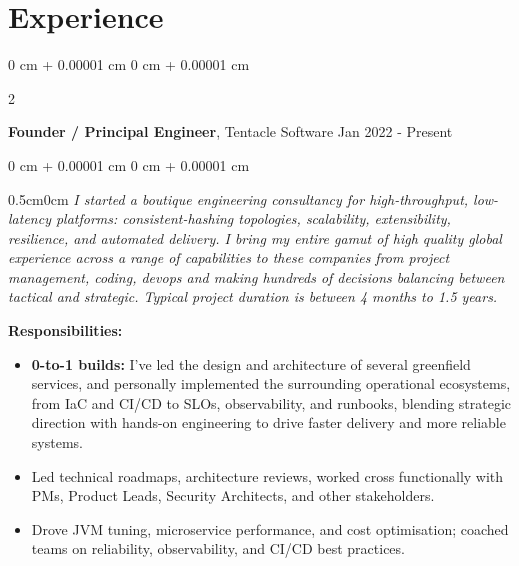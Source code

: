 \documentclass[10pt, letterpaper]{article}
\newenvironment{onecolentry}{
    \begin{adjustwidth}{
        0 cm + 0.00001 cm
    }{
        0 cm + 0.00001 cm
    }
}{
    \end{adjustwidth}
} %
\newenvironment{twocolentry}[2][]{
    \onecolentry
    \def\secondColumn{#2}
    \setcolumnwidth{\fill, 4.5 cm}
    \begin{paracol}{2}
}{
    \switchcolumn \raggedleft \secondColumn
    \end{paracol}
    \endonecolentry
} %
\begin{document}
    \section{Experience}
        \vspace{0.15 cm}
        \begin{twocolentry}{
            Jan 2022 - Present
        }
        \textbf{Founder / Principal Engineer}, Tentacle Software\end{twocolentry}

        \vspace{0.10 cm}
        \begin{onecolentry}
            \begin{adjustwidth}{0.5cm}{0cm}
            \textit{I started a boutique engineering consultancy for high-throughput, low-latency platforms: consistent-hashing topologies, scalability, extensibility, resilience, and automated delivery. I bring my entire gamut of high quality global experience across a range of capabilities to these companies from project management, coding, devops and making hundreds of decisions balancing between tactical and strategic. Typical project duration is between 4 months to 1.5 years.}
            \end{adjustwidth}

            \vspace{0.10 cm}
            \hspace{0.5cm}\textbf{Responsibilities:}
            \begin{itemize}[
                topsep=0.10 cm,
                parsep=0.10 cm,
                partopsep=0pt,
                itemsep=0pt,
                leftmargin=0 cm + 10pt + 0.5cm
            ]
                \item \textbf{0-to-1 builds:} I’ve led the design and architecture of several greenfield services, and personally implemented the surrounding operational ecosystems, from IaC and CI/CD to SLOs, observability, and runbooks, blending strategic direction with hands-on engineering to drive faster delivery and more reliable systems.
                \item Led technical roadmaps, architecture reviews, worked cross functionally with PMs, Product Leads, Security Architects, and other stakeholders.
                \item Drove JVM tuning, microservice performance, and cost optimisation; coached teams on reliability, observability, and CI/CD best practices.
            \end{itemize}


\end{onecolentry}
\end{document}
